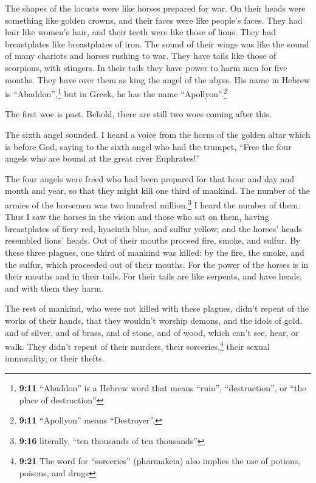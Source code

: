  The shapes of the locusts were like horses prepared for
war. On their heads were something like golden crowns, and their faces
were like people's faces.  They had hair like women's
hair, and their teeth were like those of lions.  They had
breastplates like breastplates of iron. The sound of their wings was
like the sound of many chariots and horses rushing to war.
 They have tails like those of scorpions, with stingers.
In their tails they have power to harm men for five months.
 They have over them as king the angel of the abyss. His
name in Hebrew is ``Abaddon'',\footnote{\textbf{9:11} ``Abaddon'' is a
  Hebrew word that means ``ruin'', ``destruction'', or ``the place of
  destruction''} but in Greek, he has the name ``Apollyon''.\footnote{\textbf{9:11}
  ``Apollyon'' means ``Destroyer''.}

 The first woe is past. Behold, there are still two woes
coming after this.

 The sixth angel sounded. I heard a voice from the horns
of the golden altar which is before God,  saying to the
sixth angel who had the trumpet, ``Free the four angels who are bound at
the great river Euphrates!''

 The four angels were freed who had been prepared for
that hour and day and month and year, so that they might kill one third
of mankind.  The number of the armies of the horsemen was
two hundred million.\footnote{\textbf{9:16} literally, ``ten thousands
  of ten thousands''} I heard the number of them.  Thus I
saw the horses in the vision and those who sat on them, having
breastplates of fiery red, hyacinth blue, and sulfur yellow; and the
horses' heads resembled lions' heads. Out of their mouths proceed fire,
smoke, and sulfur.  By these three plagues, one third of
mankind was killed: by the fire, the smoke, and the sulfur, which
proceeded out of their mouths.  For the power of the
horses is in their mouths and in their tails. For their tails are like
serpents, and have heads; and with them they harm.

 The rest of mankind, who were not killed with these
plagues, didn't repent of the works of their hands, that they wouldn't
worship demons, and the idols of gold, and of silver, and of brass, and
of stone, and of wood, which can't see, hear, or walk. 
They didn't repent of their murders, their sorceries,\footnote{\textbf{9:21}
  The word for ``sorceries'' (pharmakeia) also implies the use of
  potions, poisons, and drugs} their sexual immorality, or their thefts.

